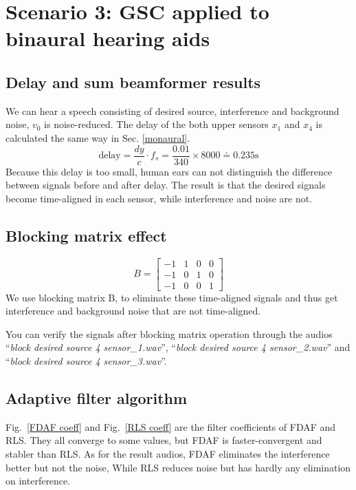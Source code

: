 \documentclass[onecolumn, conference]{IEEEtran}
\begin{document}
\section{Scenario 3: GSC applied to binaural hearing aids}

\subsection{Delay and sum beamformer results}

We can hear a speech consisting of desired source, interference and background noise, $v_0$ is noise-reduced. The delay of the both upper sensors $x_1$ and $x_4$ is calculated the same way in Sec. \ref{monaural}.
\begin{equation*}
\text{delay} = \frac{dy}{c}\cdot f_s =\frac{0.01}{340} \times 8000 \doteq 0.235 \text{s}
\end{equation*}
Because this delay is too small, human ears can not distinguish the difference between signals before and after delay. The result is that the desired signals become time-aligned in each sensor, while interference and noise are not. 

\subsection{Blocking matrix effect}

\begin{equation}       
B = \begin{bmatrix}
-1 & 1 & 0 & 0\\ 
-1 & 0 & 1 & 0\\  
-1 & 0 & 0 & 1
\end{bmatrix}     
\end{equation}
We use blocking matrix B, to eliminate these time-aligned signals and thus get interference and background noise that are not time-aligned.

You can verify the signals after blocking matrix operation through the audios ``\textit{block desired source 4 sensor\_1.wav}'', ``\textit{block desired source 4 sensor\_2.wav}'' and ``\textit{block desired source 4 sensor\_3.wav}''.
\subsection{Adaptive filter algorithm}
Fig.~\ref{FDAF coeff} and Fig.~\ref{RLS coeff} are the filter coefficients of FDAF and RLS. They all converge to some values, but FDAF is faster-convergent and stabler than RLS. As for the result audios, FDAF eliminates the interference better but not the noise, While RLS reduces noise but has hardly any elimination on interference.
\end{document}
